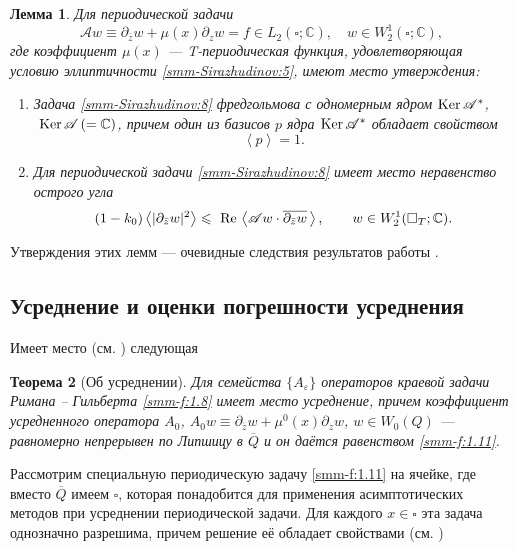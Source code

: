 \documentclass[a4paper,12pt]{article}
\newtheorem{theorem}{Теорема}[section]
\newtheorem{lemma}[theorem]{Лемма}
\theoremstyle{definition}
\begin{document}
	\begin{lemma}
		Для периодической задачи
		\begin{equation}\label{smm-Sirazhudinov:8}
			\mathscr{A}w\equiv \partial_{\bar{z}}w +\mu(x) \partial_{z}w =f\in L_2(\square;\mathbb{C}),\quad
			w\in W_2^1(\square;\mathbb{C}),
		\end{equation}
		где коэффициент $\mu(x)$  --- {T}-периодическая функция, удовлетворяющая условию эллиптичности \eqref{smm-Sirazhudinov:5}, имеют место  утверждения:
		\begin{enumerate}
			\item[1)] Задача  \eqref{smm-Sirazhudinov:8} фредгольмова с одномерным ядром $\text{Ker\,}\mathscr{A}^\ast$, $\text{ Ker\,}\mathscr{A}\,(=\mathbb{C})$,
			причем один из базисов $p$ ядра
			$\text{Ker\,}\mathscr{A}^\ast$ обладает свойством
			\begin{equation*}%
				\left< p\right>=1.
			\end{equation*}
			\item[2)] Для периодической задачи \eqref{smm-Sirazhudinov:8} имеет место неравенство острого угла
			\begin{equation}\label{smm-Sirazhudinov:9}
				(1-k_0)\left<|\partial_{\bar{z}}w|^2\right>\leqslant \text{ Re\,}
				\left<\mathscr{A} w\cdot \overline{\partial_{\bar{z}}w}\,\right>,\qquad
				w \in W_2^1(\square_T;\mathbb{C}).
			\end{equation}
		\end{enumerate}
	\end{lemma}
	Утверждения этих лемм --- очевидные следствия результатов работы \cite{smm-10}.


	\subsection{Усреднение и оценки погрешности усреднения}
	
	Имеет место (см. \cite{smm-10})  следующая
	
\begin{theorem}[Об усреднении]
 Для семейства $\{A_\varepsilon\}$ операторов краевой
		задачи Римана -- Гильберта \eqref{smm-f:1.8} имеет место усреднение, причем коэффициент
		усредненного оператора $A_0$, $A_0w\equiv\partial_{\overline{z}}w+\mu^0(x)\partial_zw$, $w\in W_0(Q)$ --- равномерно непрерывен  по Липшицу в $\overline{Q}$ и он даётся равенством \eqref{smm-f:1.11}.
\end{theorem}

Рассмотрим специальную периодическую задачу \eqref{smm-f:1.11} на ячейке, где вместо $\overline{Q}$ имеем $\square$,  которая понадобится для применения асимптотических методов при усреднении периодической задачи. Для каждого $x\in\square$ эта задача однозначно разрешима, причем решение её обладает свойствами (см. \cite{smm-10})
\end{document}
